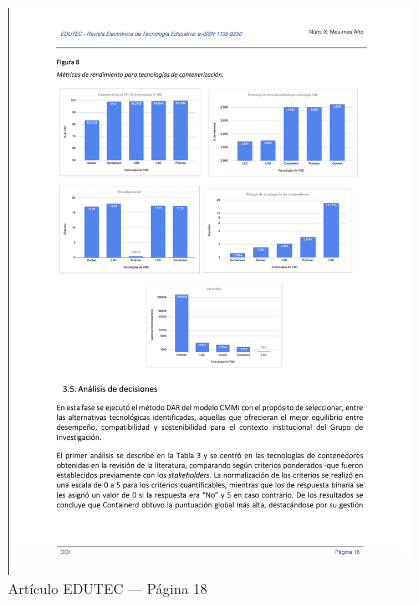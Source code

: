 \begin{figure}[H]
    \centering
    \begin{tcolorbox}[
        colback=white,
        colframe=gray!50,
        boxrule=1pt,
        arc=2pt,
        boxsep=5pt,
        left=3pt,
        right=3pt,
        top=3pt,
        bottom=3pt,
        drop shadow
    ]
        \includegraphics[width=0.95\textwidth,keepaspectratio]{apendices/EDUTEC/18.png}
    \end{tcolorbox}
    \caption{Artículo EDUTEC --- Página 18}\label{fig:edutec-pagina-18}
\end{figure}
\FloatBarrier

